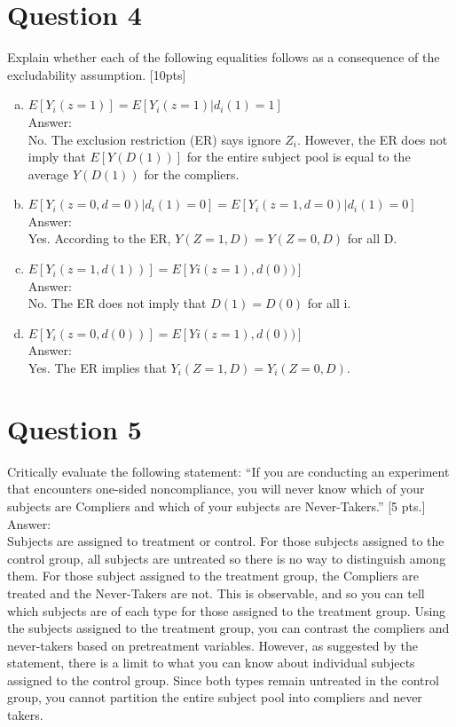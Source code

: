 \documentclass[11pt,notitlepage]{article}\usepackage[]{graphicx}\usepackage[]{color}
\begin{document}
\section*{Question 4}
Explain whether each of the following equalities follows as a consequence of the excludability assumption. [10pts]
\begin{enumerate}[a)]
\item $E[Y_i(z = 1)] = E[Y_i(z = 1) | d_i(1)=1]$ \\
Answer:\\
No. The exclusion restriction (ER) says ignore $Z_i$. However, the ER does not imply that $E[Y(D(1))]$ for the entire subject pool is equal to the average $Y(D(1))$ for the compliers. 
\item $E[Y_i(z = 0,d = 0)| d_i(1) = 0] = E[Y_i(z = 1,d = 0)| d_i(1) =0]$\\
Answer:\\
Yes. According to the ER, $Y(Z=1, D) = Y(Z=0, D)$ for all D.

\item $E[Y_i(z = 1, d(1))] = E[Yi(z = 1), d(0))]$\\
Answer:\\
No. The ER does not imply that $D(1)=D(0)$ for all i.  

\item $E[Y_i(z = 0, d(0))] = E[Yi(z = 1), d(0))]$\\
Answer:\\
Yes. The ER implies that $Y_i(Z=1,D)=Y_i(Z=0,D)$. 
\end{enumerate}
\section*{Question 5}
Critically evaluate the following statement: ``If you are conducting an experiment that encounters one-sided noncompliance, you will never know which of your subjects are Compliers and which of your subjects are Never-Takers.'' [5 pts.]\\
Answer:\\
Subjects are assigned to treatment or control. For those subjects assigned to the control group, all subjects are untreated so there is no way to distinguish among them. For those subject assigned to the treatment group, the Compliers are treated and the Never-Takers are not. This is observable, and so you can tell which subjects are of each type for those assigned to the treatment group. Using the subjects assigned to the treatment group, you can contrast the compliers and never-takers based on pretreatment variables.  However, as suggested by the statement, there is a limit to what you can know about individual subjects assigned to the control group. Since both types remain untreated in the control group, you cannot partition the entire subject pool into compliers and never takers.
\end{document}
